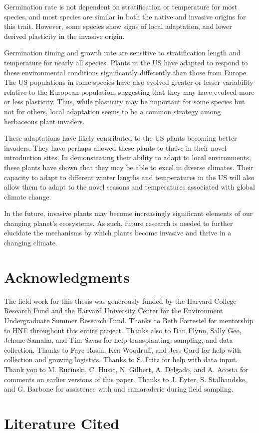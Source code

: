 \documentclass[12pt]{article}\usepackage[]{graphicx}\usepackage[]{color}
\begin{document}
	
	Germination rate is not dependent on stratification or temperature for most species, and most species are similar in both the native and invasive origins for this trait. However, some species show signs of local adaptation, and lower derived plasticity in the invasive origin. 
	
	Germination timing and growth rate are sensitive to stratification length and temperature for nearly all species. Plants in the US have adapted to respond to these environmental conditions significantly differently than those from Europe. The US populations in some species have also evolved greater or lesser variability relative to the European population, suggesting that they may have evolved more or less plasticity. Thus, while plasticity may be important for some species but not for others, local adaptation seems to be a common strategy among herbaceous plant invaders. 
	
	These adaptations have likely contributed to the US plants becoming better invaders. They have perhaps allowed these plants to thrive in their novel introduction sites. In demonstrating their ability to adapt to local environments, these plants have shown that they may be able to excel in diverse climates. Their capacity to adapt to different winter lengths and temperatures in the US will also allow them to adapt to the novel seasons and temperatures associated with global climate change.  
	
	In the future, invasive plants may become increasingly significant elements of our changing planet’s ecosystems. As such, future research is needed to further elucidate the mechanisms by which plants become invasive and thrive in a changing climate. 
	
	
	\section{Acknowledgments}
	 The field work for this thesis was generously funded by the Harvard College Research Fund and the Harvard University Center for the Environment Undergraduate Summer Research Fund. Thanks to Beth Forrestel for mentorship to HNE throughout this entire project. Thanks also to Dan Flynn, Sally Gee, Jehane Samaha, and Tim Savas for help transplanting, sampling, and data collection. Thanks to Faye Rosin, Kea Woodruff, and Jess Gard for help with collection and growing logistics. Thanks to S. Fritz for help with data input. Thank you to M. Rucinski, C. Husic, N. Gilbert, A. Delgado, and A. Acosta for comments on earlier versions of this paper. Thanks to J. Eyter, S. Stalhandske, and G. Barbone for assistence with and camaraderie during field sampling. 

	

\section{Literature Cited}
\end{document}
